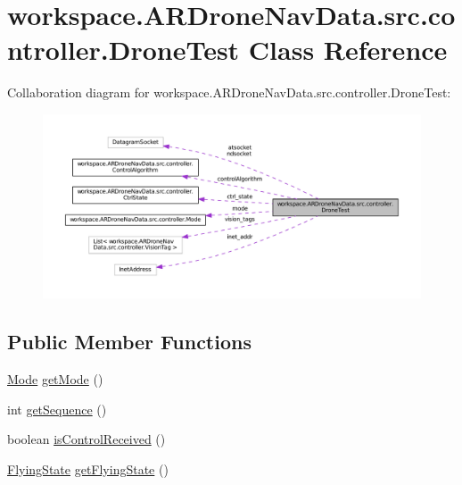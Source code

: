 \hypertarget{classworkspace_1_1_a_r_drone_nav_data_1_1src_1_1controller_1_1_drone_test}{}\section{workspace.\+A\+R\+Drone\+Nav\+Data.\+src.\+controller.\+Drone\+Test Class Reference}
\label{classworkspace_1_1_a_r_drone_nav_data_1_1src_1_1controller_1_1_drone_test}


Collaboration diagram for workspace.\+A\+R\+Drone\+Nav\+Data.\+src.\+controller.\+Drone\+Test\+:\nopagebreak
\begin{figure}[H]
\begin{center}
\leavevmode
\includegraphics[width=350pt]{classworkspace_1_1_a_r_drone_nav_data_1_1src_1_1controller_1_1_drone_test__coll__graph}
\end{center}
\end{figure}
\subsection*{Public Member Functions}
\begin{DoxyCompactItemize}
\item 
\hyperlink{enumworkspace_1_1_a_r_drone_nav_data_1_1src_1_1controller_1_1_mode}{Mode} \hyperlink{classworkspace_1_1_a_r_drone_nav_data_1_1src_1_1controller_1_1_drone_test_a17cc6de8c7d6d683c4dfe339c392db7c}{get\+Mode} ()
\item 
int \hyperlink{classworkspace_1_1_a_r_drone_nav_data_1_1src_1_1controller_1_1_drone_test_ab22353267c9012f0818b0e422c2a878f}{get\+Sequence} ()
\item 
boolean \hyperlink{classworkspace_1_1_a_r_drone_nav_data_1_1src_1_1controller_1_1_drone_test_a6e8da43e47455a014905db259c57b1e7}{is\+Control\+Received} ()
\item 
\hyperlink{enumworkspace_1_1_a_r_drone_nav_data_1_1src_1_1controller_1_1_flying_state}{Flying\+State} \hyperlink{classworkspace_1_1_a_r_drone_nav_data_1_1src_1_1controller_1_1_drone_test_a19b4e8b07fc5151945985052d02b26ba}{get\+Flying\+State} ()
\end{DoxyCompactItemize}
